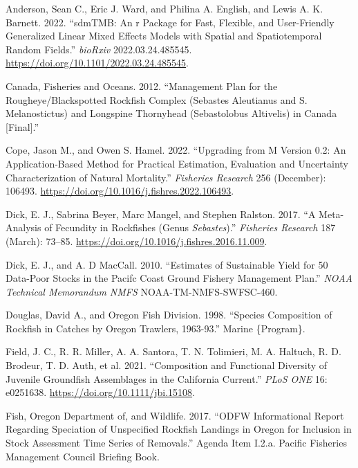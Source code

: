 \documentclass[
]{scrartcl}
\newlength{\cslhangindent}
\newenvironment{CSLReferences}[2] %
 {\begin{list}{}{%
  \setlength{\itemindent}{0pt}
  \setlength{\leftmargin}{0pt}
  \setlength{\parsep}{0pt}
  \ifodd #1
   \setlength{\leftmargin}{\cslhangindent}
   \setlength{\itemindent}{-1\cslhangindent}
  \fi
  \setlength{\itemsep}{#2\baselineskip}}}
 {\end{list}}
\begin{document}
\label{refs}
\begin{CSLReferences}{1}{0}
Anderson, Sean C., Eric J. Ward, and Philina A. English, and Lewis A. K.
Barnett. 2022. {``{sdmTMB}: An r Package for Fast, Flexible, and
User-Friendly Generalized Linear Mixed Effects Models with Spatial and
Spatiotemporal Random Fields.''} \emph{bioRxiv} 2022.03.24.485545.
\url{https://doi.org/10.1101/2022.03.24.485545}.

Canada, Fisheries and Oceans. 2012. {``Management {Plan} for the
{Rougheye}/{Blackspotted} {Rockfish} {Complex} ({Sebastes} Aleutianus
and {S}. Melanostictus) and {Longspine} {Thornyhead} ({Sebastolobus}
Altivelis) in {Canada} {[}{Final}{]}.''}

Cope, Jason M., and Owen S. Hamel. 2022. {``Upgrading from {M} Version
0.2: {An} Application-Based Method for Practical Estimation, Evaluation
and Uncertainty Characterization of Natural Mortality.''}
\emph{Fisheries Research} 256 (December): 106493.
\url{https://doi.org/10.1016/j.fishres.2022.106493}.

Dick, E. J., Sabrina Beyer, Marc Mangel, and Stephen Ralston. 2017. {``A
Meta-Analysis of Fecundity in Rockfishes (Genus \emph{Sebastes}).''}
\emph{Fisheries Research} 187 (March): 73--85.
\url{https://doi.org/10.1016/j.fishres.2016.11.009}.

Dick, E. J., and A. D MacCall. 2010. {``Estimates of Sustainable Yield
for 50 Data-Poor Stocks in the {Pacifc} Coast Ground {Fishery}
{Management} {Plan}.''} \emph{NOAA Technical Memorandum NMFS}
NOAA-TM-NMFS-SWFSC-460.

Douglas, David A., and Oregon Fish Division. 1998. {``Species
Composition of Rockfish in Catches by {Oregon} Trawlers, 1963-93.''}
Marine \{Program\}.

Field, J. C., R. R. Miller, A. A. Santora, T. N. Tolimieri, M. A.
Haltuch, R. D. Brodeur, T. D. Auth, et al. 2021. {``Composition and
Functional Diversity of Juvenile Groundfish Assemblages in the
{C}alifornia {C}urrent.''} \emph{PLoS ONE} 16: e0251638.
\url{https://doi.org/10.1111/jbi.15108}.

Fish, Oregon Department of, and Wildlife. 2017. {``ODFW Informational
Report Regarding Speciation of Unspecified Rockfish Landings in Oregon
for Inclusion in Stock Assessment Time Series of Removals.''} Agenda
Item I.2.a. Pacific Fisheries Management Council Briefing Book.


\end{CSLReferences}
\end{document}

